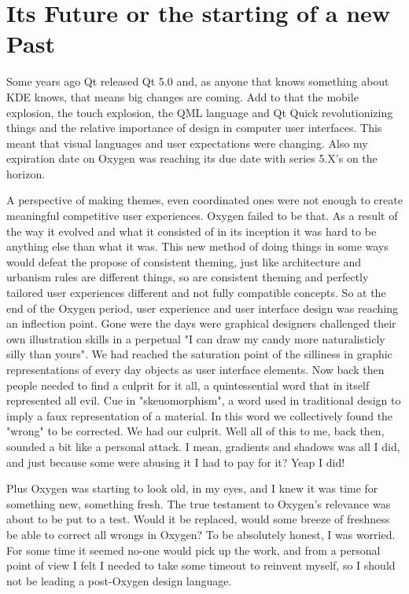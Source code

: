 \section*{Its Future or the starting of a new Past}
Some years ago Qt released Qt 5.0 and, as anyone that knows something about KDE knows, that means big changes are coming. Add to that the mobile explosion, the touch explosion, the QML language and Qt Quick revolutionizing things and the relative importance of design in computer user interfaces.
This meant that visual languages and user expectations were changing. Also my expiration date on Oxygen was reaching its due date with series 5.X's on the horizon.

A perspective of making themes, even coordinated ones were not enough to create meaningful competitive user experiences.        
Oxygen failed to be that. As a result of the way it evolved and what it consisted of in its inception it was hard to be anything else than what it was. This new method of doing things in some ways would defeat the propose of consistent theming, just like architecture and urbanism rules are different things, so are consistent theming and perfectly tailored user experiences different and not fully compatible concepts.    
So at the end of the Oxygen period, user experience and user interface design was reaching an inflection point. Gone were the days were graphical designers challenged their own illustration skills in a perpetual "I can draw my candy more naturalisticly silly than yours".
We had reached the saturation point of the silliness in graphic representations of every day objects as user interface elements. Now back then people needed to find a culprit for it all, a quintessential word that in itself represented all evil. Cue in "skeuomorphism", a word used in traditional design to imply a faux representation of a material. In this word we collectively found the "wrong" to be corrected. We had our culprit.
Well all of this to me, back then, sounded a bit like a personal attack. I mean, gradients and shadows was all I did, and just because some were abusing it I had to pay for it? Yeap I did!

Plus Oxygen was starting to look old, in my eyes, and I knew it was time for something new, something fresh. 
The true testament to Oxygen's relevance was about to be put to a test. Would it be replaced, would some breeze of freshness be able to correct all wrongs in Oxygen?
To be absolutely honest, I was worried. For some time it seemed no-one would pick up the work, and from a personal point of view I felt I needed to take some timeout to reinvent myself, so I should not be leading a post-Oxygen design language.

